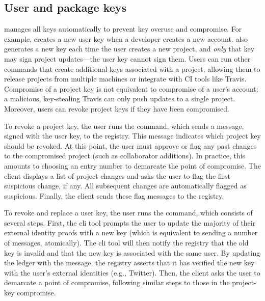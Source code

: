 
\subsection{User and package keys}
\spam{} manages all keys automatically to prevent key overuse and compromise.
For example, \spam{} creates a new user key when a developer creates a new
account. \spam{} also generates a new key each time the user creates a new
project, and \emph{only} that key may sign project updates---the user key
cannot sign them. Users can run other \spam{} commands that create additional
keys associated with a project, allowing them to release projects from multiple
machines or integrate with CI tools like Travis. Compromise of a project key is
not equivalent to compromise of a user's account; a malicious, key-stealing
Travis can only push updates to a single project. Moreover, users can revoke
project keys if they have been compromised.

To revoke a project key, the user runs the \revokeprojkeycmd{} command, which
sends a message, signed with the user key, to the registry. This message
indicates which project key should be revoked. At this point, the user must
approve or flag any past changes to the compromised project (such as
collaborator additions). In practice, this amounts to choosing an entry number
to demarcate the point of compromise. The \spam{} client displays a list of
project changes and asks the user to flag the first suspicious change, if any.
All subsequent changes are automatically flagged as suspicious. Finally, the
\spam client sends these flag messages to the registry.

To revoke and replace a user key, the user runs the \replaceuserkeycmd{}
command, which consists of several steps. First, the cli tool prompts the user
to update the majority of their external identity proofs with a new key (which
is equivalent to sending a number of \proveidentity messages, atomically). The
cli tool will then notify the registry that the old key is invalid and that the
new key is associated with the same user. By updating the ledger with the
\replaceuserkey{} message, the registry asserts that it has verified the new
key with the user's external identities (e.g., Twitter). Then, the \spam client
asks the user to demarcate a point of compromise, following similar steps to
those in the project-key compromise. 

